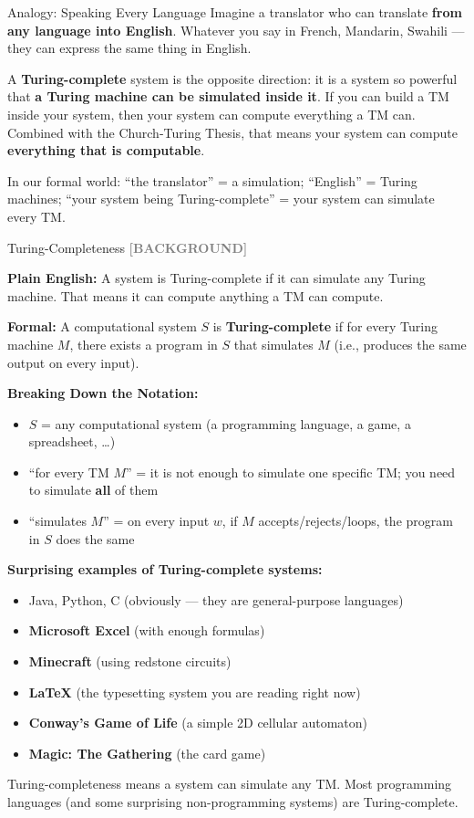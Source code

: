 \documentclass[11pt,a4paper]{article}
\newcommand{\kbg}{\textcolor{gray}{\textbf{[BACKGROUND]}}}
\newcommand{\kt}[1]{\par\vspace{0.3em}\colorbox{yellow!60}{\parbox{\dimexpr\linewidth-2\fboxsep}{#1}}\vspace{0.3em}}
\begin{document}
\begin{notebox}{Analogy: Speaking Every Language}
Imagine a translator who can translate \textbf{from any language into English}. Whatever you say in French, Mandarin, Swahili --- they can express the same thing in English.

A \textbf{Turing-complete} system is the opposite direction: it is a system so powerful that \textbf{a Turing machine can be simulated inside it}. If you can build a TM inside your system, then your system can compute everything a TM can. Combined with the Church-Turing Thesis, that means your system can compute \textbf{everything that is computable}.

In our formal world: ``the translator'' = a simulation; ``English'' = Turing machines; ``your system being Turing-complete'' = your system can simulate every TM.
\end{notebox}

\begin{definitionbox}{Turing-Completeness \kbg}

\textbf{Plain English:}
A system is Turing-complete if it can simulate any Turing machine. That means it can compute anything a TM can compute.

\textbf{Formal:}
A computational system $S$ is \textbf{Turing-complete} if for every Turing machine $M$, there exists a program in $S$ that simulates $M$ (i.e., produces the same output on every input).

\textbf{Breaking Down the Notation:}
\begin{itemize}[nosep]
\item $S$ = any computational system (a programming language, a game, a spreadsheet, \ldots)
\item ``for every TM $M$'' = it is not enough to simulate one specific TM; you need to simulate \textbf{all} of them
\item ``simulates $M$'' = on every input $w$, if $M$ accepts/rejects/loops, the program in $S$ does the same
\end{itemize}

\textbf{Surprising examples of Turing-complete systems:}
\begin{itemize}[nosep]
\item Java, Python, C (obviously --- they are general-purpose languages)
\item \textbf{Microsoft Excel} (with enough formulas)
\item \textbf{Minecraft} (using redstone circuits)
\item \textbf{\LaTeX} (the typesetting system you are reading right now)
\item \textbf{Conway's Game of Life} (a simple 2D cellular automaton)
\item \textbf{Magic: The Gathering} (the card game)
\end{itemize}

\kt{Turing-completeness means a system can simulate any TM. Most programming languages (and some surprising non-programming systems) are Turing-complete.}
\end{definitionbox}
\end{document}
